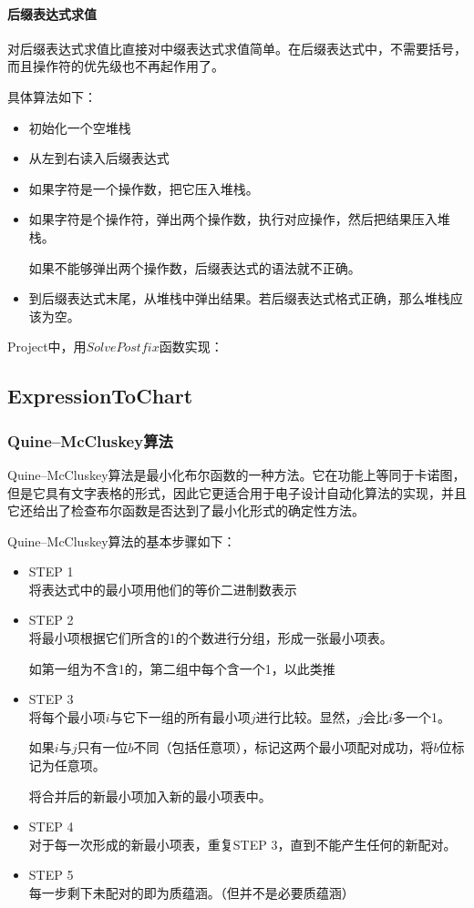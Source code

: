 \paragraph{后缀表达式求值\\}
	对后缀表达式求值比直接对中缀表达式求值简单。在后缀表达式中，不需要括号，而且操作符的优先级也不再起作用了。
	
	具体算法如下：

	\begin{itemize}
		\item	初始化一个空堆栈
		\item	从左到右读入后缀表达式
		\item	如果字符是一个操作数，把它压入堆栈。
		\item	如果字符是个操作符，弹出两个操作数，执行对应操作，然后把结果压入堆栈。
		
		如果不能够弹出两个操作数，后缀表达式的语法就不正确。
		\item	到后缀表达式末尾，从堆栈中弹出结果。若后缀表达式格式正确，那么堆栈应该为空。
	\end{itemize}

	Project中，用$SolvePostfix$函数实现：
		

\subsection{ExpressionToChart}
\subsubsection{Quine–McCluskey算法}
	Quine–McCluskey算法是最小化布尔函数的一种方法。它在功能上等同于卡诺图，但是它具有文字表格的形式，因此它更适合用于电子设计自动化算法的实现，并且它还给出了检查布尔函数是否达到了最小化形式的确定性方法。
	
	Quine–McCluskey算法的基本步骤如下：
	\begin{itemize}
		\item{STEP 1\\}	
			将表达式中的最小项用他们的等价二进制数表示
		\item{STEP 2\\}
			将最小项根据它们所含的1的个数进行分组，形成一张最小项表。
			
			如第一组为不含1的，第二组中每个含一个1，以此类推
		\item{STEP 3\\}
			将每个最小项$i$与它下一组的所有最小项$j$进行比较。显然，$j$会比$i$多一个1。
			
			如果$i$与$j$只有一位$b$不同（包括任意项），标记这两个最小项配对成功，将$b$位标记为任意项。
			
			将合并后的新最小项加入新的最小项表中。
			
		\item{STEP 4\\}
			对于每一次形成的新最小项表，重复STEP 3，直到不能产生任何的新配对。
		
		\item{STEP 5\\}
			每一步剩下未配对的即为质蕴涵。（但并不是必要质蕴涵）
	\end{itemize}
	
